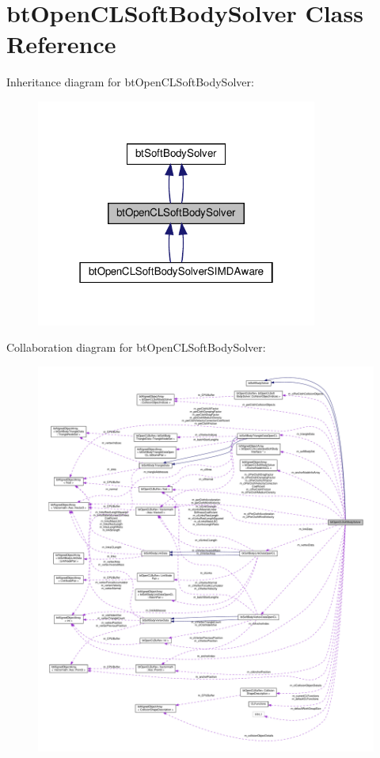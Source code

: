 \hypertarget{classbtOpenCLSoftBodySolver}{}\section{bt\+Open\+C\+L\+Soft\+Body\+Solver Class Reference}
\label{classbtOpenCLSoftBodySolver}


Inheritance diagram for bt\+Open\+C\+L\+Soft\+Body\+Solver\+:
\nopagebreak
\begin{figure}[H]
\begin{center}
\leavevmode
\includegraphics[width=262pt]{classbtOpenCLSoftBodySolver__inherit__graph}
\end{center}
\end{figure}


Collaboration diagram for bt\+Open\+C\+L\+Soft\+Body\+Solver\+:
\nopagebreak
\begin{figure}[H]
\begin{center}
\leavevmode
\includegraphics[width=350pt]{classbtOpenCLSoftBodySolver__coll__graph}
\end{center}
\end{figure}
